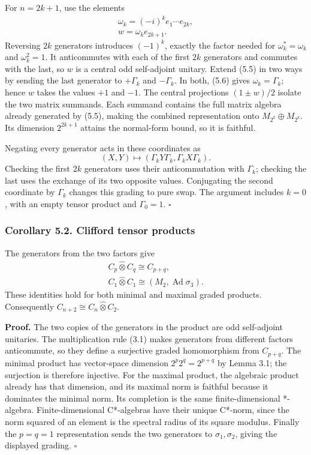 \documentclass[
  11pt,
]{article}
\begin{document}
For \(n=2k+1\), use the elements \[
\begin{gathered}
\omega_k=(-i)^ke_1\cdots e_{2k},\\
 w=\omega_ke_{2k+1}.
\end{gathered}
\tag{5.7}
\] Reversing \(2k\) generators introduces \((-1)^k\), exactly the factor
needed for \(\omega_k^*=\omega_k\) and \(\omega_k^2=1\). It anticommutes
with each of the first \(2k\) generators and commutes with the last, so
\(w\) is a central odd self-adjoint unitary. Extend (5.5) in two ways by
sending the last generator to \(+\Gamma_k\) and \(-\Gamma_k\). In both,
(5.6) gives \(\omega_k=\Gamma_k\); hence \(w\) takes the values \(+1\)
and \(-1\). The central projections \((1\pm w)/2\) isolate the two
matrix summands. Each summand contains the full matrix algebra already
generated by (5.5), making the combined representation onto
\(M_{2^k}\oplus M_{2^k}\). Its dimension \(2^{2k+1}\) attains the
normal-form bound, so it is faithful.

Negating every generator acts in these coordinates as \[
(X,Y)\longmapsto(\Gamma_kY\Gamma_k,\Gamma_kX\Gamma_k).
\tag{5.8}
\] Checking the first \(2k\) generators uses their anticommutation with
\(\Gamma_k\); checking the last uses the exchange of its two opposite
values. Conjugating the second coordinate by \(\Gamma_k\) changes this
grading to pure swap. The argument includes \(k=0\), with an empty
tensor product and \(\Gamma_0=1\). \(\square\)

\subsubsection{Corollary 5.2. Clifford tensor
products}\label{corollary-5.2.-clifford-tensor-products}

The generators from the two factors give \[
\begin{gathered}
C_p\widehat\otimes C_q\cong C_{p+q},
\\
C_1\widehat\otimes C_1\cong(M_2,\operatorname{Ad}\sigma_3).
\end{gathered}
\tag{5.9}
\] These identities hold for both minimal and maximal graded products.
Consequently \(C_{n+2}\cong C_n\widehat\otimes C_2\).

\textbf{Proof.} The two copies of the generators in the product are odd
self-adjoint unitaries. The multiplication rule (3.1) makes generators
from different factors anticommute, so they define a surjective graded
homomorphism from \(C_{p+q}\). The minimal product has vector-space
dimension \(2^p2^q=2^{p+q}\) by Lemma 3.1; the surjection is therefore
injective. For the maximal product, the algebraic product already has
that dimension, and its maximal norm is faithful because it dominates
the minimal norm. Its completion is the same finite-dimensional
*-algebra. Finite-dimensional C*-algebras have their unique C*-norm,
since the norm squared of an element is the spectral radius of its
square modulus. Finally the \(p=q=1\) representation sends the two
generators to \(\sigma_1,\sigma_2\), giving the displayed grading.
\(\square\)
\end{document}
